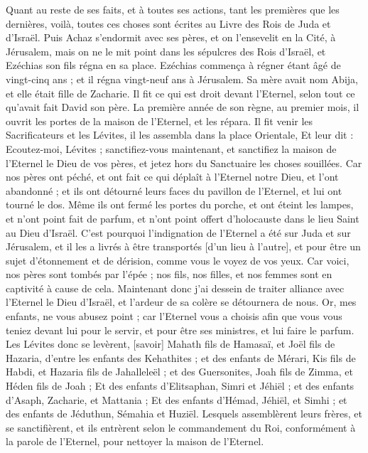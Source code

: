 \begin{multicols}{2}
Quant au reste de ses faits, et à toutes ses actions, tant les premières que les dernières, voilà, toutes ces choses sont écrites au Livre des Rois de Juda et d'Israël.
Puis Achaz s'endormit avec ses pères, et on l'ensevelit en la Cité, à Jérusalem, mais on ne le mit point dans les sépulcres des Rois d'Israël, et Ezéchias son fils régna en sa place.
\VerseOne{}Ezéchias commença à régner étant âgé de vingt-cinq ans ; et il régna vingt-neuf ans à Jérusalem. Sa mère avait nom Abija, et elle était fille de Zacharie.
Il fit ce qui est droit devant l'Eternel, selon tout ce qu'avait fait David son père.
La première année de son règne, au premier mois, il ouvrit les portes de la maison de l'Eternel, et les répara.
Il fit venir les Sacrificateurs et les Lévites, il les assembla dans la place Orientale,
Et leur dit : Ecoutez-moi, Lévites ; sanctifiez-vous maintenant, et sanctifiez la maison de l'Eternel le Dieu de vos pères, et jetez hors du Sanctuaire les choses souillées.
Car nos pères ont péché, et ont fait ce qui déplaît à l'Eternel notre Dieu, et l'ont abandonné ; et ils ont détourné leurs faces du pavillon de l'Eternel, et lui ont tourné le dos.
Même ils ont fermé les portes du porche, et ont éteint les lampes, et n'ont point fait de parfum, et n'ont point offert d'holocauste dans le lieu Saint au Dieu d'Israël.
C'est pourquoi l'indignation de l'Eternel a été sur Juda et sur Jérusalem, et il les a livrés à être transportés [d'un lieu à l'autre], et pour être un sujet d'étonnement et de dérision, comme vous le voyez de vos yeux.
Car voici, nos pères sont tombés par l'épée ; nos fils, nos filles, et nos femmes sont en captivité à cause de cela.
Maintenant donc j'ai dessein de traiter alliance avec l'Eternel le Dieu d'Israël, et l'ardeur de sa colère se détournera de nous.
Or, mes enfants, ne vous abusez point ; car l'Eternel vous a choisis afin que vous vous teniez devant lui pour le servir, et pour être ses ministres, et lui faire le parfum.
Les Lévites donc se levèrent, [savoir] Mahath fils de Hamasaï, et Joël fils de Hazaria, d'entre les enfants des Kehathites ; et des enfants de Mérari, Kis fils de Habdi, et Hazaria fils de Jahalleleël ; et des Guersonites, Joah fils de Zimma, et Héden fils de Joah ;
Et des enfants d'Elitsaphan, Simri et Jéhiël ; et des enfants d'Asaph, Zacharie, et Mattania ;
Et des enfants d'Hémad, Jéhiël, et Simhi ; et des enfants de Jéduthun, Sémahia et Huziël.
Lesquels assemblèrent leurs frères, et se sanctifièrent, et ils entrèrent selon le commandement du Roi, conformément à la parole de l'Eternel, pour nettoyer la maison de l'Eternel.

\end{multicols}

